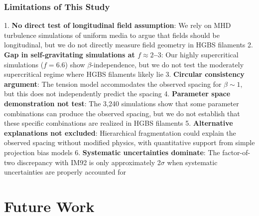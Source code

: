 \documentclass[11pt,a4paper]{article}
\begin{document}
\subsubsection{Limitations of This Study}

1. \textbf{No direct test of longitudinal field assumption}: We rely on MHD turbulence simulations of uniform media to argue that fields should be longitudinal, but we do not directly measure field geometry in HGBS filaments
2. \textbf{Gap in self-gravitating simulations at $f \approx 2$--$3$}: Our highly supercritical simulations ($f = 6.6$) show $\beta$-independence, but we do not test the moderately supercritical regime where HGBS filaments likely lie
3. \textbf{Circular consistency argument}: The tension model accommodates the observed spacing for $\beta \sim 1$, but this does not independently predict the spacing
4. \textbf{Parameter space demonstration not test}: The 3,240 simulations show that some parameter combinations can produce the observed spacing, but we do not establish that these specific combinations are realized in HGBS filaments
5. \textbf{Alternative explanations not excluded}: Hierarchical fragmentation could explain the observed spacing without modified physics, with quantitative support from simple projection bias models
6. \textbf{Systematic uncertainties dominate}: The factor-of-two discrepancy with IM92 is only approximately 2$\sigma$ when systematic uncertainties are properly accounted for

\section{Future Work}
\label{sec:future}
\end{document}
